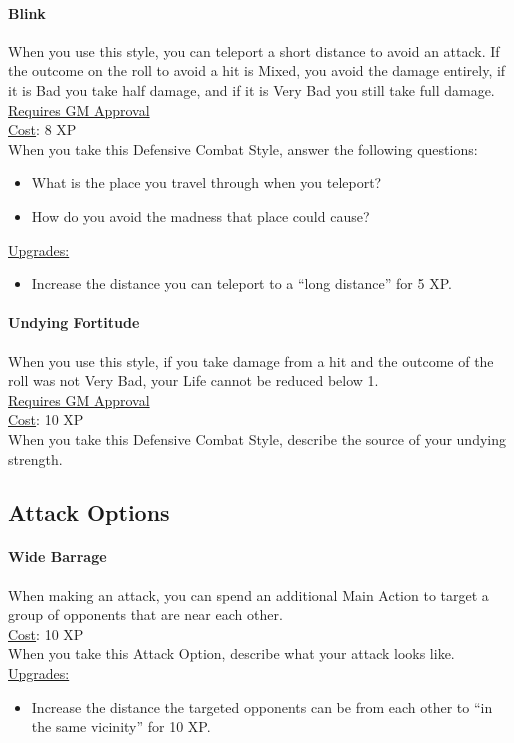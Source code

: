 \paragraph{Blink}
When you use this style, you can teleport a short distance to avoid an attack.
If the outcome on the roll to avoid a hit is Mixed, you avoid the damage entirely, if it is Bad you take half damage, and if it is Very Bad you still take full damage.
\\[.5cm]
\underline{Requires GM Approval}
\\
\underline{Cost}: 8 XP
\\
When you take this Defensive Combat Style, answer the following questions:
\begin{itemize}
  \item What is the place you travel through when you teleport?
  \item How do you avoid the madness that place could cause?
\end{itemize}
%
\underline{Upgrades:}
\begin{itemize}
  \item[-] Increase the distance you can teleport to a ``long distance'' for 5 XP.
\end{itemize}

\paragraph{Undying Fortitude}
When you use this style, if you take damage from a hit and the outcome of the roll was not Very Bad, your Life cannot be reduced below 1.
\\[.5cm]
\underline{Requires GM Approval}
\\
\underline{Cost}: 10 XP
\\
When you take this Defensive Combat Style, describe the source of your undying strength.

\subsection{Attack Options}
\paragraph{Wide Barrage}
When making an attack, you can spend an additional Main Action to target a group of opponents that are near each other.
\\[.5cm]
\underline{Cost}: 10 XP
\\
When you take this Attack Option, describe what your attack looks like.
\\
\underline{Upgrades:}
\begin{itemize}
  \item[-] Increase the distance the targeted opponents can be from each other to ``in the same vicinity'' for 10 XP.
\end{itemize}

